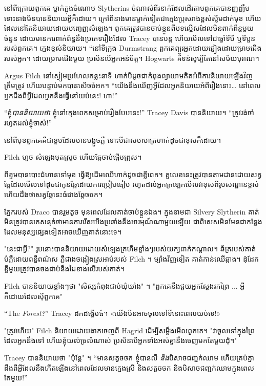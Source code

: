 នៅ​ពី​ក្រោយ​ពួក​គេ ម្នាក់​ក្នុង​ចំណោម​ Slytherins ចំណាស់​ពីរ​នាក់​ដែល​ដើរ​តាម​ពួក​គេ​បាន​ញញឹម ទោះ​នាង​មិន​បាន​និយាយ​អ្វី​ក៏​ដោយ។ ក្រៅ​ពី​នាង​មាន​ម្នាក់​ទៀត​ជា​ក្មេង​ប្រុស​រាង​ខ្ពស់​ស្លីម​ដាក់​មុខ ហើយ​ដែល​នៅ​តែ​និយាយ​ដោយ​បញ្ចេញ​សំឡេង។ ពួកគេ​ត្រូវ​បាន​ចាប់​ខ្លួន​ពី​បទ​ល្មើស​ដែល​មិន​ពាក់ព័ន្ធ​មួយ​ចំនួន ដោយ​មាន​ការ​ពាក់ព័ន្ធ​នឹង​ប្រភេទ​រឿង​ដែល Tracey បាន​បន្ត ហើយ​មើល​ទៅ​ជា​ឆ្នាំ​ទី​បី ឬ​ទី​បួន​របស់​ពួកគេ។ ក្មេង​ខ្ពស់​និយាយ។ “នៅទីក្រុង Durmstrang ពួកគេព្យួរអ្នកដោយផ្អៀងដោយម្រាមជើងរបស់អ្នក។ ដោយម្រាមជើងមួយ ប្រសិនបើអ្នកអន់ចិត្ត។ Hogwarts គឺទន់សូម្បីតែនៅសម័យបុរាណ។

Argus Filch នៅស្ងៀមប្រហែលកន្លះនាទី ហាក់បីដូចជាកំពុងព្យាយាមគិតអំពីការនិយាយឡើងវិញត្រឹមត្រូវ ហើយបន្ទាប់មកបានសើចចំអក។ “យើងនឹងឃើញអ្វីដែលអ្នកនិយាយអំពីរឿងនោះ… នៅពេលអ្នកដឹងពីអ្វីដែលអ្នកនឹងធ្វើនៅយប់នេះ! ហា!”

“ខ្ញុំ\emph{បាននិយាយថា} ខ្ញុំនៅក្មេងពេកសម្រាប់រឿងបែបនេះ!” Tracey Davis បាននិយាយ។ “ត្រូវរង់ចាំរហូតដល់ខ្ញុំចាស់!”

នៅពីមុខពួកគេគឺជាខ្ទមដែលមានបង្អួចភ្លឺ ទោះបីជាសមាមាត្រហាក់ដូចជាខុសក៏ដោយ។

Filch ហួច សំឡេងមុតស្រួច ហើយឆ្កែចាប់ផ្តើមព្រុស។

ពីខ្ទមបានបោះជំហានទៅមុខ ធ្វើឱ្យដើមឈើហាក់ដូចជាខ្លីពេក។ តួលេខនេះត្រូវបានតាមដានដោយសត្វឆ្កែដែលមើលទៅដូចជាកូនឆ្កែដោយការប្រៀបធៀប រហូតដល់អ្នកក្រឡេកមើលវាខុសពីរូបសណ្ឋានខ្ពស់ ហើយដឹងថាសត្វឆ្កែនេះធំជាងឆ្កែចចក។

ភ្នែករបស់ Draco បានរួមតូច មុនពេលដែលគាត់ចាប់ខ្លួនឯង។ ក្នុងនាមជា Silvery Slytherin គាត់មិនត្រូវបានគេសន្មត់ថាមានការរើសអើងប្រឆាំងនឹងអារម្មណ៍ណាមួយឡើយ ជាពិសេសមិនមែនជាកន្លែងដែលមនុស្សផ្សេងទៀតអាចឃើញគាត់នោះទេ។

"នេះជាអ្វី?" រូបនោះបាននិយាយដោយសំឡេងគ្រហឹមខ្លាំងៗរបស់យក្សពាក់កណ្តាល។ ឆ័ត្រ​របស់​គាត់​បំភ្លឺ​ដោយ​ពន្លឺ​ពណ៌​ស ភ្លឺ​ជាង​ចង្កៀង​ស្រអាប់​របស់ Filch ។ ម្យ៉ាងវិញទៀត គាត់កាន់ឈើឆ្កាង។ ដុំដែកខ្លីមួយត្រូវបានចងជាប់នឹងដៃខាងលើរបស់គាត់។

Filch បាននិយាយខ្លាំងៗថា "សិស្សកំពុងជាប់ឃុំឃាំង" ។ "ពួកគេនឹងជួយអ្នកស្វែងរកព្រៃ ... អ្វីក៏ដោយដែលស៊ីពួកគេ"

“The \emph{Forest?}” Tracey ដកដង្ហើមធំ។ «យើង​មិន​អាច​ចូល​ទៅ​ទីនោះ​ពេល​យប់​ទេ!»

"ត្រូវហើយ" Filch និយាយដោយងាកចេញពី Hagrid ដើម្បីសម្លឹងមើលពួកគេ។ "វាចូលទៅក្នុងព្រៃដែលអ្នកនឹងទៅ ហើយខ្ញុំយល់ច្រលំណាស់ ប្រសិនបើអ្នកទាំងអស់គ្នានឹងចេញមកតែមួយដុំ។"

Tracey បាននិយាយថា "ប៉ុន្តែ" ។ “មានសត្វចចក ខ្ញុំបានលឺ \emph{និង}បិសាចជញ្ជក់ឈាម ហើយគ្រប់គ្នាដឹងពីអ្វីដែលនឹងកើតឡើងនៅពេលដែលមានក្មេងស្រី និងសត្វចចក និងបិសាចជញ្ជក់ឈាមក្នុងពេលតែមួយ!”

